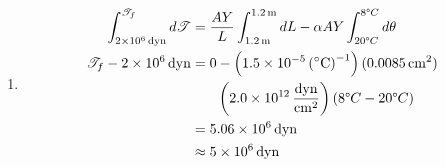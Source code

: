 \documentclass[a4paper,12pt]{article}
\begin{document}
\begin{enumerate}
	\item
	\begin{align*}
		\int_{\SI{2e6}{dyn}}^{\mathscr{T}_f} d\mathscr{T} &= \frac{AY}{L} \int_{\SI{1.2}{m}}^{\SI{1.2}{m}} dL -\alpha AY \int_{20\degree C}^{8\degree C} d\theta \\
		\mathscr{T}_f - \SI{2e6}{dyn} &= 0 - \left( \SI{1.5e-5}{(\degree C)^{-1}} \right) (\SI{0.0085}{cm^2}) \\
		&\phantom{{}=1} \left( \SI{2.0e12}{\frac{dyn}{cm^2}} \right) (8\degree C - 20\degree C) \\
		&= \SI{5.06e6}{dyn} \\
		&\approx \SI{5e6}{dyn}
	\end{align*}

\end{enumerate}
\end{document}
